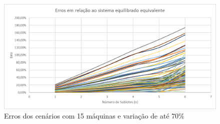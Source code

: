 \begin{figure}[!ht]
    \centering
    \includegraphics[width=12cm]{Resultados/Figuras/e15_70}
    \caption{Erros dos cenários com 15 máquinas e variação de até 70\%}
    \label{fig:e15_70}
\end{figure}
